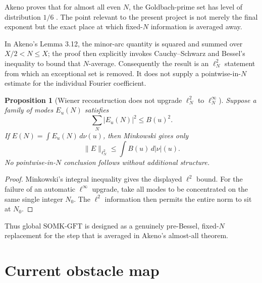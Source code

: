 \documentclass[11pt]{article}
\newtheorem{proposition}[theorem]{Proposition}
\theoremstyle{definition}
\theoremstyle{remark}
\newcommand{\1}{\mathbf 1}
\newcommand{\SOMK}{\mathrm{SOMK}\text{-}\mathrm{GFT}}
\begin{document}
Akeno proves that for almost all even \(N\), the Goldbach-prime set has level of distribution \(1/6\) \cite{Akeno}.  The point relevant to the present project is not merely the final exponent but the exact place at which fixed-\(N\) information is averaged away.

In Akeno's Lemma 3.12, the minor-arc quantity is squared and summed over \(X/2<N\le X\); the proof then explicitly invokes Cauchy--Schwarz and Bessel's inequality to bound that \(N\)-average.  Consequently the result is an \(\ell^2_N\) statement from which an exceptional set is removed.  It does not supply a pointwise-in-\(N\) estimate for the individual Fourier coefficient.

\begin{proposition}[Wiener reconstruction does not upgrade \(\ell^2_N\) to \(\ell^\infty_N\)]\label{prop:no-l2-linf}
Suppose a family of modes \(E_u(N)\) satisfies
\[
 \sum_N|E_u(N)|^2\le B(u)^2.
\]
If \(E(N)=\int E_u(N)\,d\nu(u)\), then Minkowski gives only
\[
 \|E\|_{\ell^2_N}
 \le\int B(u)\,d|\nu|(u).
\]
No pointwise-in-\(N\) conclusion follows without additional structure.
\end{proposition}

\begin{proof}
Minkowski's integral inequality gives the displayed \(\ell^2\) bound.  For the failure of an automatic \(\ell^\infty\) upgrade, take all modes to be concentrated on the same single integer \(N_0\).  The \(\ell^2\) information then permits the entire norm to sit at \(N_0\).
\end{proof}

Thus global \(\SOMK\) is designed as a genuinely pre-Bessel, fixed-\(N\) replacement for the step that is averaged in Akeno's almost-all theorem.

\section{Current obstacle map}\label{sec:status-map}
\end{document}
